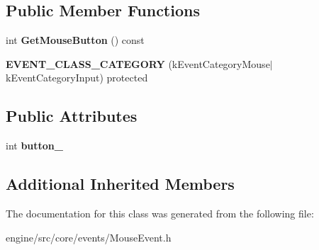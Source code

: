 \subsection*{Public Member Functions}
\begin{DoxyCompactItemize}
\item 
\mbox{\label{classengine_1_1events_1_1MouseButtonEvent_ad6e5db5a8f746d3e0da996246f4df035}} 
int {\bfseries Get\+Mouse\+Button} () const
\item 
\mbox{\label{classengine_1_1events_1_1MouseButtonEvent_a7c6def7727370e4d850806c0b6fd5379}} 
{\bfseries E\+V\+E\+N\+T\+\_\+\+C\+L\+A\+S\+S\+\_\+\+C\+A\+T\+E\+G\+O\+RY} (k\+Event\+Category\+Mouse$\vert$k\+Event\+Category\+Input) protected
\end{DoxyCompactItemize}
\subsection*{Public Attributes}
\begin{DoxyCompactItemize}
\item 
\mbox{\label{classengine_1_1events_1_1MouseButtonEvent_ac8f03e2926022023b87a713cb44e85b7}} 
int {\bfseries button\+\_\+}
\end{DoxyCompactItemize}
\subsection*{Additional Inherited Members}


The documentation for this class was generated from the following file\+:\begin{DoxyCompactItemize}
\item 
engine/src/core/events/Mouse\+Event.\+h\end{DoxyCompactItemize}
